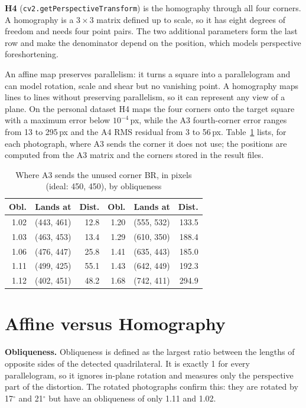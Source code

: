 \documentclass[conference]{IEEEtran}
\begin{document}
\textbf{H4} (\texttt{cv2.getPerspectiveTransform}) is the homography through
all four corners. A homography is a $3\times3$ matrix defined up to scale,
so it has eight degrees of freedom and needs four point pairs. The two
additional parameters form the last row and make the denominator depend on
the position, which models perspective foreshortening.

An affine map preserves parallelism: it turns a square into a parallelogram
and can model rotation, scale and shear but no vanishing point. A homography
maps lines to lines without preserving parallelism, so it can represent any
view of a plane. On the personal dataset H4 maps the four corners onto the
target square with a maximum error below $10^{-4}$\,px, while the A3
fourth-corner error ranges from 13 to 295\,px and the A4 RMS residual from 3
to 56\,px. Table~\ref{tab:a3br} lists, for each photograph, where A3 sends
the corner it does not use; the positions are computed from the A3 matrix
and the corners stored in the result files.

\begin{table}[t]
\caption{Where A3 sends the unused corner BR, in pixels (ideal: 450, 450), by obliqueness}
\label{tab:a3br}
\centering
\begin{tabular}{rrr@{\hskip 1.5em}rrr}
\toprule
Obl. & Lands at & Dist. & Obl. & Lands at & Dist.\\
\midrule
1.02 & (443, 461) & 12.8 & 1.20 & (555, 532) & 133.5\\
1.03 & (463, 453) & 13.4 & 1.29 & (610, 350) & 188.4\\
1.06 & (476, 447) & 25.8 & 1.41 & (635, 443) & 185.0\\
1.11 & (499, 425) & 55.1 & 1.43 & (642, 449) & 192.3\\
1.12 & (402, 451) & 48.2 & 1.68 & (742, 411) & 294.9\\
\bottomrule
\end{tabular}
\end{table}

\section{Affine versus Homography}
\textbf{Obliqueness.} Obliqueness is defined as the largest ratio between
the lengths of opposite sides of the detected quadrilateral. It is exactly 1
for every parallelogram, so it ignores in-plane rotation and measures only
the perspective part of the distortion. The rotated photographs confirm
this: they are rotated by 17$^\circ$ and 21$^\circ$ but have an obliqueness
of only 1.11 and 1.02.
\end{document}
